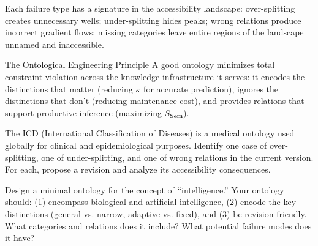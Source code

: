 Each failure type has a signature in the accessibility landscape:
over-splitting creates unnecessary wells; under-splitting hides
peaks; wrong relations produce incorrect gradient flows; missing
categories leave entire regions of the landscape unnamed and inaccessible.

\begin{namedthm}{The Ontological Engineering Principle}
  A good ontology minimizes total constraint violation across the
  knowledge infrastructure it serves: it encodes the distinctions
  that matter (reducing $\kappa$ for accurate prediction), ignores
  the distinctions that don't (reducing maintenance cost), and
  provides relations that support productive inference (maximizing
  $S_{\mathbf{Sem}}$).
\end{namedthm}

\begin{exercise}
  The ICD (International Classification of Diseases) is a medical
  ontology used globally for clinical and epidemiological purposes.
  Identify one case of over-splitting, one of under-splitting,
  and one of wrong relations in the current version. For each,
  propose a revision and analyze its accessibility consequences.
\end{exercise}

\begin{exercise}
  Design a minimal ontology for the concept of ``intelligence.''
  Your ontology should: (1) encompass biological and artificial
  intelligence, (2) encode the key distinctions (general vs. narrow,
  adaptive vs. fixed), and (3) be revision-friendly. What categories
  and relations does it include? What potential failure modes does it have?
\end{exercise}
